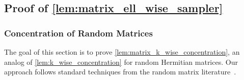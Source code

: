 \documentclass[10pt,a4paper]{article}
\newtheorem{lemma}[theorem]{Lemma}
\newcommand{\R}{\mathbb{R}}
\DeclareMathOperator*{\E}{\mathbb{E}}
\newcommand{\eps}{\varepsilon}
\newcommand{\1}{\mathbbm{1}}
\newcommand{\tuple}[1]{\left(#1\right)}
\newcommand{\Ex}[2][]{\E_{#1}\left[#2\right]}
\begin{document}
\subsection{Proof of \cref{lem:matrix_ell_wise_sampler}}
\label{sec:matrix_lemma_proof}
\subsubsection{Concentration of Random Matrices}
The goal of this section is to prove \cref{lem:matrix_k_wise_concentration}, an analog of \cref{lem:k_wise_concentration} for random Hermitian matrices. Our approach follows standard techniques from the random matrix literature~\cite{Tomczak1974, CGT12, LT13}.









\end{document}
